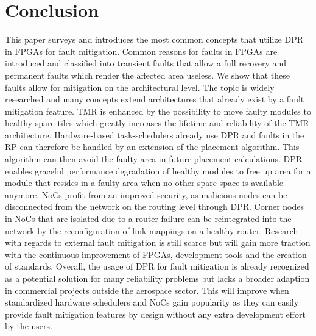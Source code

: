 \section{Conclusion}\label{Conclusion}
This paper surveys and introduces the most common concepts that utilize \gls{DPR} in \glspl{FPGA} for fault mitigation.
Common reasons for faults in \glspl{FPGA} are introduced and classified into transient faults that allow a full recovery and permanent faults which render the affected area useless. 
We show that these faults allow for mitigation on the architectural level.
The topic is widely researched and many concepts extend architectures that already exist by a fault mitigation feature.
\gls{TMR} is enhanced by the possibility to move faulty modules to healthy spare tiles which greatly increases the lifetime and reliability of the \gls{TMR} architecture.  
Hardware-based task-schedulers already use \gls{DPR} and faults in the \gls{RP} can therefore be handled by an extension of the placement algorithm.
This algorithm can then avoid the faulty area in future placement calculations.
\gls{DPR} enables graceful performance degradation of healthy modules to free up area for a module that resides in a faulty area when no other spare space is available anymore. 
\glspl{NoC} profit from an improved security, as malicious nodes can be disconnected from the network on the routing level through \gls{DPR}.
Corner nodes in \glspl{NoC} that are isolated due to a router failure can be reintegrated into the network by the reconfiguration of link mappings on a healthy router. 
Research with regards to external fault mitigation is still scarce but will gain more traction with the continuous improvement of \glspl{FPGA}, development tools and the creation of standards.
Overall, the usage of \gls{DPR} for fault mitigation is already recognized as a potential solution for many reliability problems but lacks a broader adaption in commercial projects outside the aerospace sector.
This will improve when standardized hardware schedulers and \glspl{NoC} gain popularity as they can easily provide fault mitigation features by design without any extra development effort by the users.